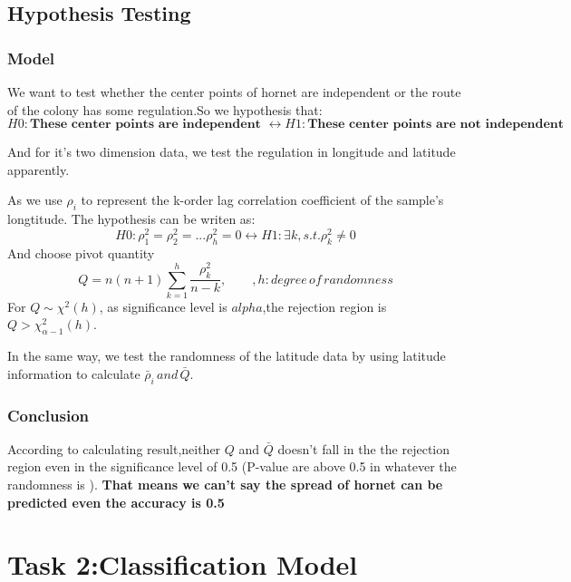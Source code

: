 \documentclass[12pt]{article}
\begin{document}
\subsection{Hypothesis Testing}
\subsubsection{Model}
We want to test whether the center points of hornet are independent or the route of the colony has some regulation.So we hypothesis that:
\begin{equation*}
H0:\textbf{These center points are independent }\leftrightarrow H1:\textbf{These center points are not independent}
\end{equation*}

And for it's two dimension data, we test the regulation in longitude and latitude apparently.

As we use $\rho_i$ to represent the k-order lag correlation coefficient of the sample's longtitude. The  hypothesis can be writen as:
\begin{equation*}
H0:\rho_1^2=\rho_2^2=...\rho_h^2=0 \leftrightarrow H1:\exists k,s.t. \rho_k^2\neq 0
\end{equation*}
And choose pivot quantity
\begin{equation}
Q=n(n+1)\sum_{k=1}^h \frac{\rho_k^2}{n-k},\qquad ,h:degree \,of\, randomness
\end{equation}
For $Q\sim \chi^2(h)$, as significance level is $alpha$,the rejection region is $Q> \chi^2_{\alpha-1}(h)$.

In the same way, we test the randomness of the latitude data by using latitude information to calculate $\bar\rho_i\,and\,\bar{Q}$.

\subsubsection{Conclusion}
According to calculating result,neither $Q$ and $\bar{Q}$ doesn't fall in the  the rejection region even in the significance level of 0.5 (P-value are above 0.5 in whatever the randomness is ). \textbf{That means we can't say the spread of hornet can be predicted even the accuracy is 0.5}

\section{Task 2:Classification Model}
\end{document}
